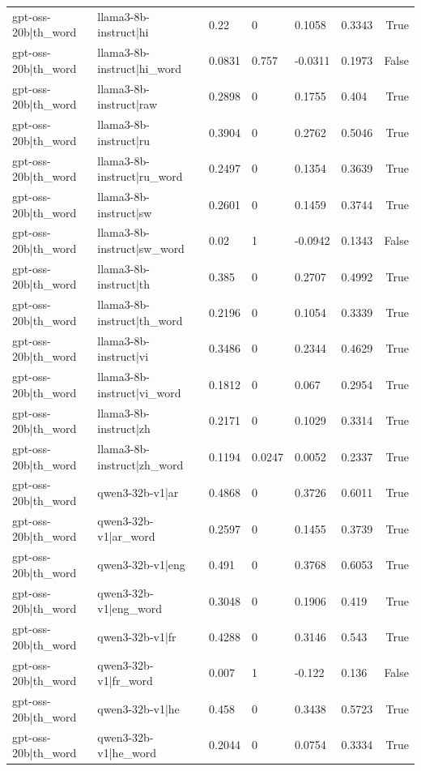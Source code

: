 \begin{table}
\begin{tabular}{llllllr}
gpt-oss-20b|th_word & llama3-8b-instruct|hi & 0.22 & 0 & 0.1058 & 0.3343 & True \\
gpt-oss-20b|th_word & llama3-8b-instruct|hi_word & 0.0831 & 0.757 & -0.0311 & 0.1973 & False \\
gpt-oss-20b|th_word & llama3-8b-instruct|raw & 0.2898 & 0 & 0.1755 & 0.404 & True \\
gpt-oss-20b|th_word & llama3-8b-instruct|ru & 0.3904 & 0 & 0.2762 & 0.5046 & True \\
gpt-oss-20b|th_word & llama3-8b-instruct|ru_word & 0.2497 & 0 & 0.1354 & 0.3639 & True \\
gpt-oss-20b|th_word & llama3-8b-instruct|sw & 0.2601 & 0 & 0.1459 & 0.3744 & True \\
gpt-oss-20b|th_word & llama3-8b-instruct|sw_word & 0.02 & 1 & -0.0942 & 0.1343 & False \\
gpt-oss-20b|th_word & llama3-8b-instruct|th & 0.385 & 0 & 0.2707 & 0.4992 & True \\
gpt-oss-20b|th_word & llama3-8b-instruct|th_word & 0.2196 & 0 & 0.1054 & 0.3339 & True \\
gpt-oss-20b|th_word & llama3-8b-instruct|vi & 0.3486 & 0 & 0.2344 & 0.4629 & True \\
gpt-oss-20b|th_word & llama3-8b-instruct|vi_word & 0.1812 & 0 & 0.067 & 0.2954 & True \\
gpt-oss-20b|th_word & llama3-8b-instruct|zh & 0.2171 & 0 & 0.1029 & 0.3314 & True \\
gpt-oss-20b|th_word & llama3-8b-instruct|zh_word & 0.1194 & 0.0247 & 0.0052 & 0.2337 & True \\
gpt-oss-20b|th_word & qwen3-32b-v1|ar & 0.4868 & 0 & 0.3726 & 0.6011 & True \\
gpt-oss-20b|th_word & qwen3-32b-v1|ar_word & 0.2597 & 0 & 0.1455 & 0.3739 & True \\
gpt-oss-20b|th_word & qwen3-32b-v1|eng & 0.491 & 0 & 0.3768 & 0.6053 & True \\
gpt-oss-20b|th_word & qwen3-32b-v1|eng_word & 0.3048 & 0 & 0.1906 & 0.419 & True \\
gpt-oss-20b|th_word & qwen3-32b-v1|fr & 0.4288 & 0 & 0.3146 & 0.543 & True \\
gpt-oss-20b|th_word & qwen3-32b-v1|fr_word & 0.007 & 1 & -0.122 & 0.136 & False \\
gpt-oss-20b|th_word & qwen3-32b-v1|he & 0.458 & 0 & 0.3438 & 0.5723 & True \\
gpt-oss-20b|th_word & qwen3-32b-v1|he_word & 0.2044 & 0 & 0.0754 & 0.3334 & True \\

\end{tabular}
\end{table}
